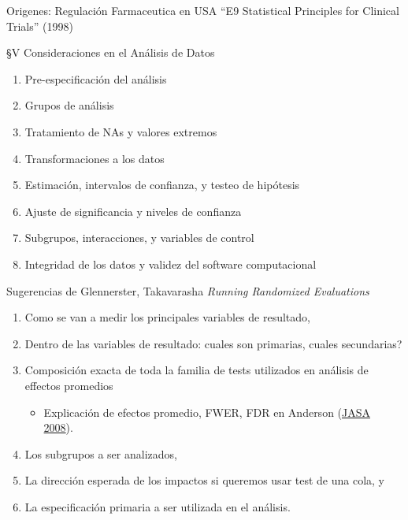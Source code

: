 \documentclass{beamer}
\begin{document}
\begin{frame}{Origenes: Regulación Farmaceutica en USA}
``E9 Statistical Principles for Clinical Trials'' (1998)
\href{http://www.fda.gov/downloads/drugs/guidancecomplianceregulatoryinformation/guidances/ucm073137.pdf}{}

\S V Consideraciones en el Análisis de Datos
\begin{enumerate}[<.->]
\item Pre-especificación del análisis
\item Grupos de análisis
\item Tratamiento de NAs y valores extremos
\item Transformaciones a los datos
\item Estimación, intervalos de confianza, y testeo de hipótesis
\item Ajuste de significancia y niveles de confianza
\item Subgrupos, interacciones, y variables de control
\item Integridad de los datos y validez del software computacional
\end{enumerate}
\end{frame}

\begin{frame}{Sugerencias de Glennerster, Takavarasha}
\textit{Running Randomized Evaluations}
\begin{enumerate}[<.->]
\def\labelenumi{\arabic{enumi}.}
\item
  Como se van a medir los principales variables de resultado, 
\item
 Dentro de las variables de resultado: cuales son primarias, cuales secundarias?
\item
Composición exacta de toda la familia de tests utilizados en análisis de effectos promedios
  \begin{itemize}
  \item Explicación de efectos promedio, FWER, FDR en Anderson (\href{https://are.berkeley.edu/~mlanderson/pdf/Anderson\%202008a.pdf}{JASA 2008}).
  \end{itemize}
\item
  Los subgrupos a ser analizados,
\item
La dirección esperada de los impactos si queremos usar test de una cola, y

\item
 La especificación primaria a ser utilizada en el análisis.
\end{enumerate}
\end{frame}
\end{document}
